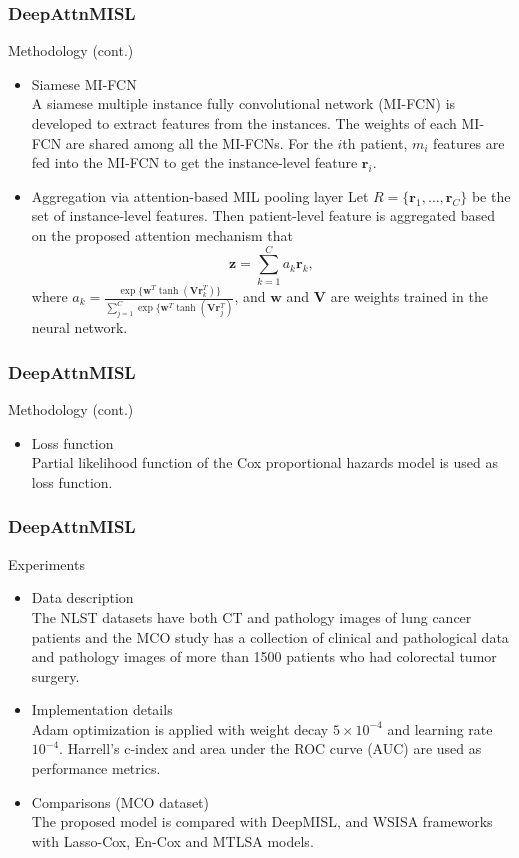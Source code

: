 \documentclass{beamer}
\begin{document}
	\begin{frame}
		\frametitle{DeepAttnMISL}
		Methodology (cont.)
		
		\begin{itemize}
			\item Siamese MI-FCN \\
			A siamese multiple instance fully convolutional network (MI-FCN) is developed to extract features from the instances. The weights of each MI-FCN are shared among all the MI-FCNs. For the $i$th patient, $m_i$ features are fed into the MI-FCN to get the instance-level feature $\mathbf{ r }_i$.
			\item Aggregation via attention-based MIL pooling layer
			Let $R = \{ \mathbf{ r }_1, \dots, \mathbf{ r }_C \}$ be the set of instance-level features. Then patient-level feature is aggregated based on the proposed attention mechanism that 
			\[
			\mathbf{ z } = \sum_{ k = 1 }^{ C } a_k \mathbf{ r }_k,
			\] 
			where $a_k = \frac{ \exp \{ \mathbf{ w }^T \tanh( \mathbf{ V }\mathbf{ r }_k^T ) \}}{ \sum_{ j = 1 }^{ C }\exp \{ \mathbf{ w }^T \tanh( \mathbf{ V }\mathbf{ r }_j^T ) }$, and $\mathbf{ w }$ and $\mathbf{V}$ are weights trained in the neural network.
		\end{itemize}
	\end{frame}
	
	\begin{frame}
		\frametitle{DeepAttnMISL}
		Methodology (cont.)
		
		\begin{itemize}
			\item Loss function \\
			\vspace{5mm}
			Partial likelihood function of the Cox proportional hazards model is used as loss function.
		\end{itemize}
	\end{frame}
	
	\begin{frame}
		\frametitle{DeepAttnMISL}
		Experiments
		
		\begin{itemize}
			\item Data description \\
			\vspace{5mm}
			The NLST datasets have both CT and pathology images of lung cancer patients and the MCO study has a collection of clinical and pathological data and pathology images of more than 1500 patients who had colorectal tumor surgery.
			\item Implementation details \\
			\vspace{5mm}
			Adam  optimization is applied with weight decay $5 \times 10^{ -4 }$ and learning rate $10^{ -4 }$. Harrell's c-index and area under the ROC curve (AUC) are used as performance metrics.
			\item Comparisons (MCO dataset) \\
			\vspace{5mm}
			The proposed model is compared with DeepMISL, and WSISA frameworks with Lasso-Cox, En-Cox and MTLSA models.
		\end{itemize}
	\end{frame}
	
\end{document}

